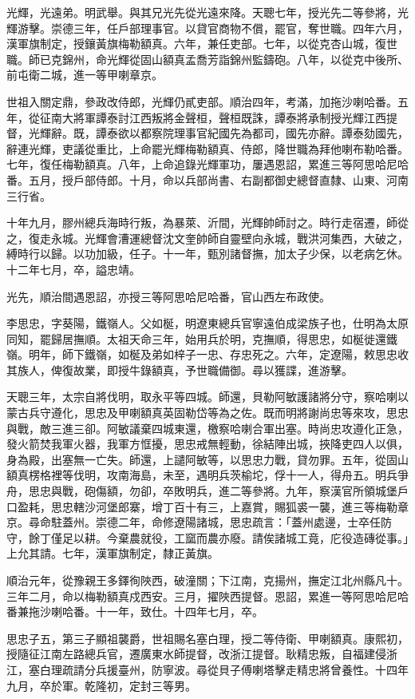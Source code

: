 \begin{pinyinscope}
光輝，光遠弟。明武舉。與其兄光先從光遠來降。天聰七年，授光先二等參將，光輝游擊。崇德三年，任戶部理事官。以貸官商物不償，罷官，奪世職。四年六月，漢軍旗制定，授鑲黃旗梅勒額真。六年，兼任吏部。七年，以從克杏山城，復世職。師已克錦州，命光輝從固山額真孟喬芳詣錦州監鑄砲。八年，以從克中後所、前屯衛二城，進一等甲喇章京。

世祖入關定鼎，參政改侍郎，光輝仍貳吏部。順治四年，考滿，加拖沙喇哈番。五年，從征南大將軍譚泰討江西叛將金聲桓，聲桓既誅，譚泰將承制授光輝江西提督，光輝辭。既，譚泰欲以都察院理事官紀國先為都司，國先亦辭。譚泰劾國先，辭連光輝，吏議從重比，上命罷光輝梅勒額真、侍郎，降世職為拜他喇布勒哈番。七年，復任梅勒額真。八年，上命追錄光輝軍功，屢遇恩詔，累進三等阿思哈尼哈番。五月，授戶部侍郎。十月，命以兵部尚書、右副都御史總督直隸、山東、河南三行省。

十年九月，膠州總兵海時行叛，為暴萊、沂間，光輝帥師討之。時行走宿遷，師從之，復走永城。光輝會漕運總督沈文奎帥師自靈壁向永城，戰洪河集西，大破之，縛時行以歸。以功加級，任子。十一年，甄別諸督撫，加太子少保，以老病乞休。十二年七月，卒，謚忠靖。

光先，順治間遇恩詔，亦授三等阿思哈尼哈番，官山西左布政使。

李思忠，字葵陽，鐵嶺人。父如梴，明遼東總兵官寧遠伯成梁族子也，仕明為太原同知，罷歸居撫順。太祖天命三年，始用兵於明，克撫順，得思忠，如梴徙還鐵嶺。明年，師下鐵嶺，如梴及弟如梓子一忠、存忠死之。六年，定遼陽，敕思忠收其族人，俾復故業，即授牛錄額真，予世職備御。尋以獲諜，進游擊。

天聰三年，太宗自將伐明，取永平等四城。師還，貝勒阿敏護諸將分守，察哈喇以蒙古兵守遵化，思忠及甲喇額真英固勒岱等為之佐。既而明將謝尚忠等來攻，思忠與戰，敵三進三卻。阿敏議棄四城東還，檄察哈喇合軍出塞。時尚忠攻遵化正急，發火箭焚我軍火器，我軍方恇擾，思忠戒無輕動，徐結陣出城，挾降吏四人以俱，身為殿，出塞無一亡失。師還，上譴阿敏等，以思忠力戰，貸勿罪。五年，從固山額真楞格裡等伐明，攻南海島，未至，遇明兵茨榆坨，俘十一人，得舟五。明兵爭舟，思忠與戰，砲傷額，勿卻，卒敗明兵，進二等參將。九年，察漢官所領城堡戶口盈耗，思忠轄沙河堡郎寨，增丁百十有三，上嘉賞，賜狐裘一襲，進三等梅勒章京。尋命駐蓋州。崇德二年，命修遼陽諸城，思忠疏言：「蓋州處邊，士卒任防守，餘丁僅足以耕。今棄農就役，工窳而農亦廢。請俟諸城工竟，庀役造磚從事。」上允其請。七年，漢軍旗制定，隸正黃旗。

順治元年，從豫親王多鐸徇陜西，破潼關；下江南，克揚州，撫定江北州縣凡十。三年二月，命以梅勒額真戍西安。三月，擢陜西提督。恩詔，累進一等阿思哈尼哈番兼拖沙喇哈番。十一年，致仕。十四年七月，卒。

思忠子五，第三子顯祖襲爵，世祖賜名塞白理，授二等侍衛、甲喇額真。康熙初，授隨征江南左路總兵官，遷廣東水師提督，改浙江提督。耿精忠叛，自福建侵浙江，塞白理疏請分兵援臺州，防寧波。尋從貝子傅喇塔擊走精忠將曾養性。十四年九月，卒於軍。乾隆初，定封三等男。


\end{pinyinscope}
